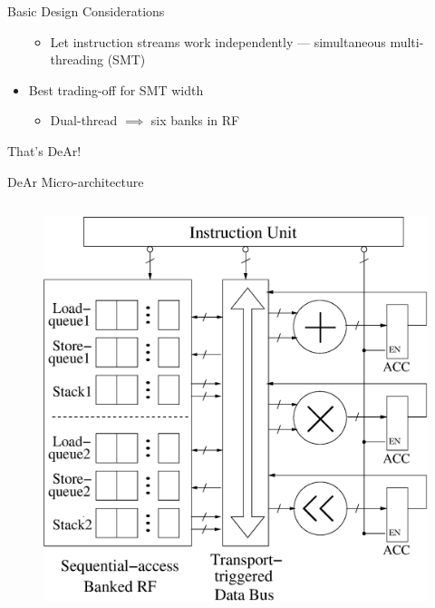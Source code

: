 \documentclass{beamer}
\begin{document}
\begin{CJK}{UTF8}{bkai}
\begin{frame}{Basic Design Considerations}
\begin{itemize}
\begin{itemize}
                            \item Let instruction streams work independently --- simultaneous multi-threading (SMT)
                        \end{itemize}
                    \item Best trading-off for SMT width
                        \begin{itemize}
                            \item Dual-thread $\implies$ six banks in RF
                        \end{itemize}
                \end{itemize}
                That's DeAr!
            \end{frame}

            \begin{frame}{DeAr Micro-architecture}
                \begin{columns}
                    \begin{column}{0.6\textwidth}
                        \begin{figure}[!ht] 
                            \centering
                            \includegraphics[width=1.0\textwidth]{./figs/micro.eps}
                        \end{figure}
                    \end{column}

\end{columns}
\end{frame}
\end{CJK}
\end{document}
